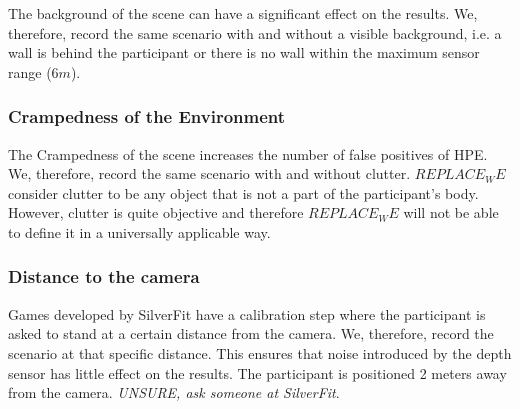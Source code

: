 The background of the scene can have a significant effect on the results. We, therefore, record the same scenario with and without a visible background, i.e. a wall is behind the participant or there is no wall within the maximum sensor range ($6m$).

\subsubsection{Crampedness of the Environment}

The Crampedness of the scene increases the number of false positives of HPE. We, therefore, record the same scenario with and without clutter. $REPLACE_WE$ consider clutter to be any object that is not a part of the participant's body. However, clutter is quite objective and therefore $REPLACE_WE$ will not be able to define it in a universally applicable way. 

\subsubsection{Distance to the camera}

Games developed by SilverFit have a calibration step where the participant is asked to stand at a certain distance from the camera. We, therefore, record the scenario at that specific distance. This ensures that noise introduced by the depth sensor has little effect on the results. The participant is positioned 2 meters away from the camera. \textit{UNSURE, ask someone at SilverFit}.


